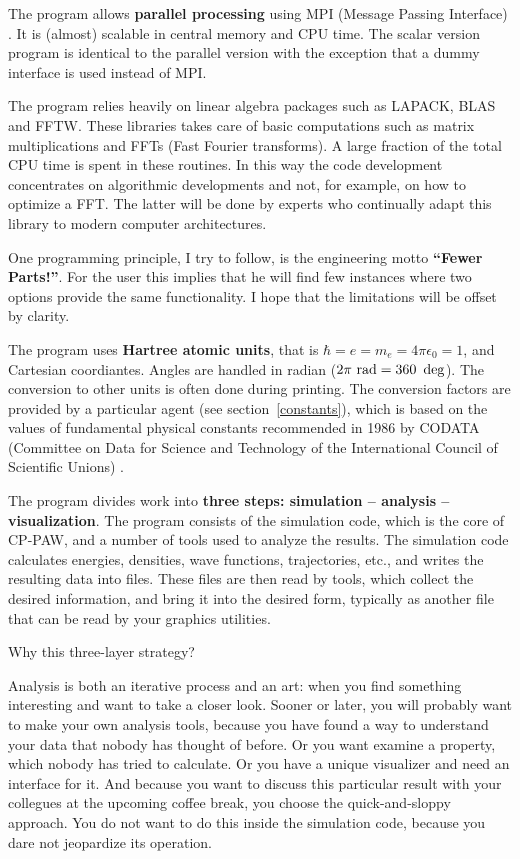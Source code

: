 \documentclass[final,12pt]{article}
\begin{document}
The program allows {\bf parallel processing} using MPI (Message
Passing Interface) \cite{mpi}. It is (almost) scalable in central
memory and CPU time.  The scalar version program is identical to the
parallel version with the exception that a dummy interface is used
instead of MPI.

The program relies heavily on linear algebra packages such as LAPACK,
BLAS and FFTW. These libraries takes care of basic computations such
as matrix multiplications and FFTs (Fast Fourier transforms). A large
fraction of the total CPU time is spent in these routines. In this way
the code development concentrates on algorithmic developments and not,
for example, on how to optimize a FFT.  The latter will be done by
experts who continually adapt this library to modern computer
architectures.

One programming principle, I try to follow, is the engineering
motto {\bf ``Fewer Parts!''}. For the user this implies that he will
find few instances where two options provide the same functionality. I
hope that the limitations will be offset by clarity.

The program uses \textbf{Hartree atomic units}, that is $\hbar=e=m_e=4\pi\epsilon_0=1$, and Cartesian
coordiantes.  Angles are handled in radian ($2\pi{\rm\ rad}=
360~\deg$).  The conversion to other units is often done during
printing. The conversion factors are provided by a particular agent
(see section~\ref{constants}), which is based on the values of
fundamental physical constants recommended in 1986 by CODATA
(Committee on Data for Science and Technology of the International
Council of Scientific Unions) \cite{mohr00_rmp72_351}.

The program divides work into {\bf three steps: simulation --
  analysis -- visualization}.  The program consists of the simulation
code, which is the core of CP-PAW, and a number of tools used to
analyze the results.  The simulation code calculates energies,
densities, wave functions, trajectories, etc., and writes the
resulting data into files.  These files are then read by tools, which
collect the desired information, and bring it into the desired
form, typically as another file that can be read by your graphics
utilities.

Why this three-layer strategy?

Analysis is both an iterative process and an art: when you find something
interesting and want to take a closer look. Sooner or later, you will
probably want to make your own analysis tools, because you have found a way
to understand your data that nobody has thought of before. Or you
want examine a property, which nobody has tried to calculate. Or
you have a unique visualizer and need an interface for it.  And
because you want to discuss this particular result with your collegues
at the upcoming coffee break, you choose the quick-and-sloppy
approach.  You do not want to do this inside the simulation code,
because you dare not jeopardize its operation.
\end{document}
